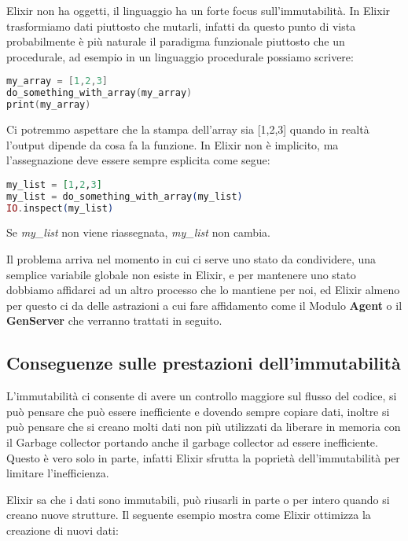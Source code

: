 Elixir non ha oggetti, il linguaggio ha un forte focus sull'immutabilità.
In Elixir trasformiamo dati piuttosto che mutarli, infatti da questo
punto di vista probabilmente è più naturale il paradigma funzionale
piuttosto che un procedurale, ad esempio in un linguaggio
procedurale possiamo scrivere:

\begin{lstlisting}[language=cpp]
my_array = [1,2,3]
do_something_with_array(my_array)
print(my_array)
\end{lstlisting}

Ci potremmo aspettare che la stampa dell'array sia [1,2,3] quando in realtà
l'output dipende da cosa fa la funzione. In Elixir non è implicito,
ma l'assegnazione deve essere sempre esplicita come segue:

\begin{lstlisting}[language=elixir]
my_list = [1,2,3]
my_list = do_something_with_array(my_list)
IO.inspect(my_list)
\end{lstlisting}

Se \textit{my\_list} non viene riassegnata, \textit{my\_list} non cambia.

Il problema arriva nel momento in cui ci serve uno stato
da condividere, una semplice variabile globale non esiste
in Elixir, e per mantenere uno stato dobbiamo
affidarci ad un altro processo che lo mantiene per noi,
ed Elixir almeno per questo ci da delle astrazioni
a cui fare affidamento come il Modulo \textbf{Agent} o il
\textbf{GenServer} che verranno trattati in seguito.

\subsection{Conseguenze sulle prestazioni dell'immutabilità}

L'immutabilità ci consente di avere un controllo maggiore
sul flusso del codice, si può pensare che può essere inefficiente
e dovendo sempre copiare dati, inoltre si può pensare che si creano
molti dati non più utilizzati da liberare in memoria con il Garbage collector
portando anche il garbage collector ad essere inefficiente.
Questo è vero solo in parte, infatti Elixir sfrutta la poprietà
dell'immutabilità per limitare l'inefficienza.

Elixir sa che i dati sono immutabili, può riusarli in parte o per
intero quando si creano nuove strutture.
Il seguente esempio mostra come Elixir ottimizza la creazione di
nuovi dati:

